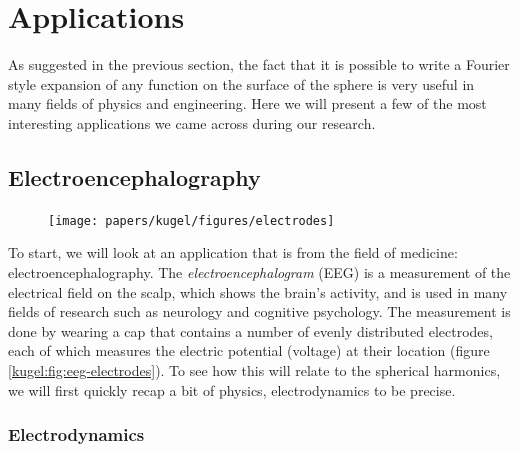 
\section{Applications}

As suggested in the previous section, the fact that it is possible to write a
Fourier style expansion of any function on the surface of the sphere is very
useful in many fields of physics and engineering. Here we will present a few of
the most interesting applications we came across during our research.

\subsection{Electroencephalography}

\begin{figure}
  \centering
    {\texttt{[image: papers/kugel/figures/electrodes]}}
  \qquad
  \caption{
    \label{kugel:fig:eeg}
  }
\end{figure}

To start, we will look at an application that is from the field of medicine:
electroencephalography. The \emph{electroencephalogram} (EEG) is a measurement
of the electrical field on the scalp, which shows the brain's activity, and is
used in many fields of research such as neurology and cognitive psychology.  The
measurement is done by wearing a cap that contains a number of evenly
distributed electrodes, each of which measures the electric potential (voltage)
at their location (figure \ref{kugel:fig:eeg-electrodes}).  To see how this will
relate to the spherical harmonics, we will first quickly recap a bit of physics,
electrodynamics to be precise.

\subsubsection{Electrodynamics}

